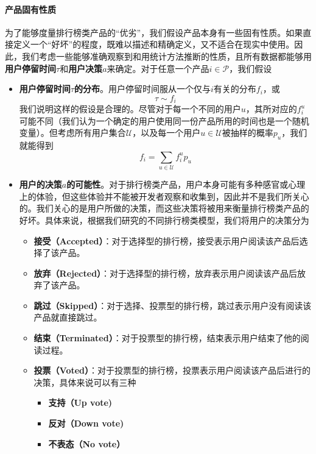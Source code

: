 \documentclass[UTF8]{ctexart}
\theoremstyle{plain}
\theoremstyle{definition}
\theoremstyle{remark}
\begin{document}
	\paragraph{产品固有性质} 为了能够度量排行榜类产品的“优劣”，我们假设产品本身有一些固有性质。如果直接定义一个“好坏”的程度，既难以描述和精确定义，又不适合在现实中使用。因此，我们考虑一些能够准确观察到和用统计方法推断的性质，且所有数据都能够用\textbf{用户停留时间}$\tau$和\textbf{用户决策}$a$来确定。对于任意一个产品$i \in \mathcal{P}$，我们假设
	\begin{itemize}
		\item \textbf{用户停留时间$\tau$的分布}。用户停留时间服从一个仅与$i$有关的分布$f_i$，或
		$$
		\tau \sim f_i
		$$
		我们说明这样的假设是合理的。尽管对于每一个不同的用户$u$，其所对应的$f_i^u$可能不同（我们认为一个确定的用户使用同一份产品所用的时间也是一个随机变量）。但考虑所有用户集合$\mathcal{U}$，以及每一个用户$u \in \mathcal{U}$被抽样的概率$p_u$，我们就能得到
		$$
		f_i = \sum_{u \in \mathcal{U}} f_i^u p_u
		$$
		\item \textbf{用户的决策$a$的可能性}。对于排行榜类产品，用户本身可能有多种感官或心理上的体验，但这些体验并不能被开发者观察和收集到，因此并不是我们所关心的。我们关心的是用户所做的决策，而这些决策将被用来衡量排行榜类产品的好坏。具体来说，根据我们研究的不同排行榜类模型，我们将用户的决策分为
		\begin{itemize}
			\item \textbf{接受（Accepted）}：对于选择型的排行榜，接受表示用户阅读该产品后选择了该产品。
			\item \textbf{放弃（Rejected）}：对于选择型的排行榜，放弃表示用户阅读该产品后放弃了该产品。
			\item \textbf{跳过（Skipped）}：对于选择、投票型的排行榜，跳过表示用户没有阅读该产品就直接跳过。
			\item \textbf{结束（Terminated）}：对于投票型的排行榜，结束表示用户结束了他的阅读过程。
			\item \textbf{投票（Voted）}：对于投票型的排行榜，投票表示用户阅读该产品后进行的决策，具体来说可以有三种
			\begin{itemize}
				\item \textbf{支持（Up vote)}
				\item \textbf{反对（Down vote)}
				\item \textbf{不表态（No vote）}
			\end{itemize}
		\end{itemize}
	\end{itemize}
\end{document}
